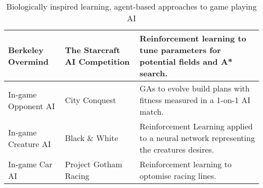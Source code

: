 \begin{table}
\begin{adjustwidth}{-4cm}{-4cm}
\begin{center}
\begin{tabular}{ | >{\raggedright}p{2.2cm} | >{\raggedright}p{3.5cm} | p{6.8cm} |}
     \\ \hline
    Berkeley Overmind \cite{overmind} & The Starcraft AI Competition &
    Reinforcement learning to tune parameters for potential fields and A* search.
    \\ \hline
    In-game Opponent AI \cite{evolutioningamedesign} & City Conquest &
    GAs to evolve build plans with fitness measured in a 1-on-1 AI match.
    \\ \hline
    In-game Creature AI\cite{blackandwhite} & Black \& White &
    Reinforcement Learning applied to a neural network representing the creatures desires.
    \\ \hline
    In-game Car AI \cite{projectgothamracing} & Project Gotham Racing &
    Reinforcement learning to optomise racing lines.
     \\ \hline
    
    \end{tabular}
  \end{center}
  \end{adjustwidth}
  \caption{\small Biologically inspired learning, agent-based approaches to game playing AI}
  \label{tab:agents}
\end{table}
